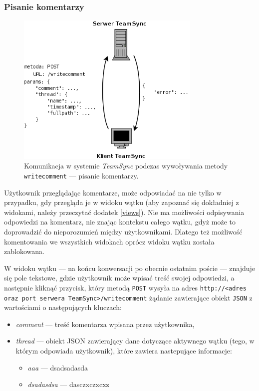 \documentclass[polish,a4paper,twoside]{ppfcmthesis}
\begin{document}
\subsubsection*{Pisanie komentarzy}

\begin{figure}[h!]
  \vspace{5pt}
  \begin{center}
    \includegraphics[width=250pt]{figures/metwritecomment.png}
  \end{center}
  \caption{Komunikacja w systemie \emph{TeamSync} podczas wywoływania metody \texttt{writecomment} --- pisanie komentarzy.}
  \label{picmetdeletefolder}
\end{figure}

Użytkownik przeglądając komentarze, może odpowiadać na nie tylko w przypadku, gdy przegląda je w widoku wątku (aby zapoznać się dokładniej z widokami, należy przeczytać dodatek \ref{views}). Nie ma możliwości odpisywania odpowiedzi na komentarz, nie znając kontekstu całego wątku, gdyż może to doprowadzić do nieporozumień między użytkownikami. Dlatego też możliwość komentowania we wszystkich widokach oprócz widoku wątku została zablokowana.

W widoku wątku --- na końcu konwersacji po obecnie ostatnim poście --- znajduje się pole tekstowe, gdzie użytkownik może wpisać treść swojej odpowiedzi, a następnie kliknąć przycisk, który metodą \texttt{POST} wysyła na adres \texttt{http://<adres oraz port serwera TeamSync>/\-writecomment} żądanie zawierające obiekt \texttt{JSON} z wartościami o następujących kluczach:

\begin{itemize}[noitemsep]
 \item \emph{comment} --- treść komentarza wpisana przez użytkownika,
 \item \emph{thread} --- obiekt JSON zawierający dane dotyczące aktywnego wątku (tego, w którym odpowiada użytkownik), które zawiera nastepujące informacje:
 \begin{itemize}[noitemsep]
  \item \emph{aaa} --- dsadsadasda
  \item \emph{dsadasdsa} --- dasczxczxcxz
 \end{itemize}
\end{itemize}
\end{document}
